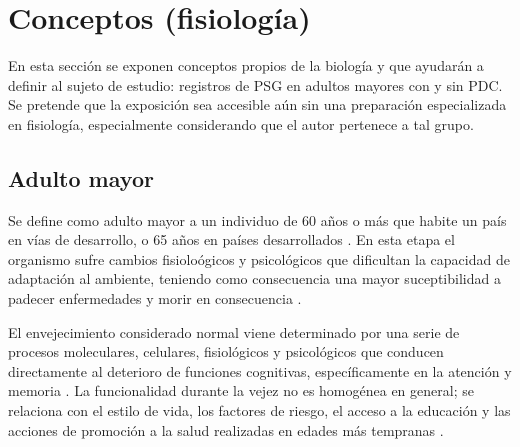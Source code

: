 \section{Conceptos (fisiolog\'ia)}

En esta secci\'on se exponen conceptos propios de la biolog\'ia y que ayudar\'an a definir
al sujeto de estudio: registros de PSG en adultos mayores con y sin PDC.
Se pretende que la exposici\'on sea accesible a\'un sin una preparaci\'on 
especializada en fisiolog\'ia, especialmente considerando que el autor pertenece a tal grupo.


\subsection{Adulto mayor}

Se define como adulto mayor a un individuo de 60 a\~nos o m\'as que habite un pa\'is en v\'ias de
desarrollo, o 65 a\~nos en pa\'ises desarrollados \cite{Hita14}.
En esta etapa 
el organismo sufre cambios fisiolo\'ogicos y psicol\'ogicos que dificultan la capacidad de
adaptaci\'on al ambiente, teniendo como consecuencia una mayor suceptibilidad a padecer enfermedades
y morir en consecuencia \cite{Hita14}.



El envejecimiento considerado normal viene determinado por una serie de procesos moleculares, 
celulares, fisiol\'ogicos y psicol\'ogicos que conducen directamente al deterioro de funciones 
cognitivas, específicamente en la atenci\'on y memoria \cite{Navarrete03,Park09}.
La
funcionalidad durante la vejez no es homog\'enea
en general; se relaciona con el estilo de vida, los factores de riesgo, el acceso a la
educaci\'on y las acciones de promoci\'on a la salud realizadas en edades m\'as tempranas
\cite{Ohayon04,Sanhueza14}.

